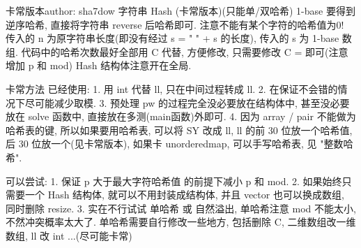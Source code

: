 卡常版本author: sha7dow
字符串 Hash (卡常版本)(只能单/双哈希)
1-base
要得到逆序哈希, 直接将字符串 reverse 后哈希即可.
注意不能有某个字符的哈希值为0!
传入的 n 为原字符串长度(即没有经过 s = " " + s 的长度), 传入的 s 为 1-base 数组.
代码中的哈希次数最好全部用 C 代替, 方便修改, 只需要修改 C = 即可(注意增加 p 和 mod)
Hash 结构体注意开在全局.


卡常方法
已经使用:
1. 用 int 代替 ll, 只在中间过程转成 ll.
2. 在保证不会错的情况下尽可能减少取模.
3. 预处理 pw 的过程完全没必要放在结构体中, 甚至没必要放在 solve 函数中, 直接放在多测(main函数)外即可.
4. 因为 array / pair 不能做为哈希表的键, 所以如果要用哈希表, 可以将 SY 改成 ll, ll 的前 30 位放一个哈希值, 
   后 30 位放一个(见卡常版本), 如果卡 unorderedmap, 可以手写哈希表, 见 "整数哈希".

可以尝试:
1. 保证 p 大于最大字符哈希值 的前提下减小 p 和 mod.
2. 如果始终只需要一个 Hash 结构体, 就可以不用封装成结构体, 并且 vector 也可以换成数组, 同时删除 resize.
3. 实在不行试试 单哈希 或 自然溢出, 单哈希注意 mod 不能太小, 不然冲突概率太大了.
   单哈希需要自行修改一些地方, 包括删除 C, 二维数组改一维数组, ll 改 int ...(尽可能卡常) 